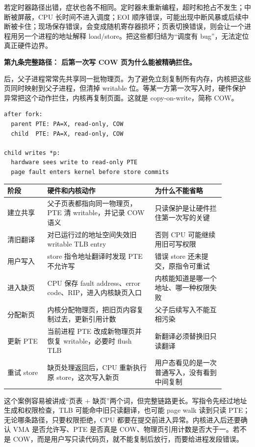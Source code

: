 若定时器路径出错，症状也各不相同。定时器未重新编程，超时和抢占不发生；中断被屏蔽，CPU 长时间不进入调度；EOI 顺序错误，可能出现中断风暴或后续中断被卡住；现场保存错误，会变成随机寄存器损坏；页表切换错误，则会让一个进程用另一个进程的地址解释 load/store。把这些都归结为“调度有 bug”，无法定位真正硬件边界。

\medskip
\noindent\textbf{第九条完整路径： 后第一次写 COW 页为什么能被精确拦住。}

 后，父子进程常常先共享同一批物理页。为了避免立刻复制所有内存，内核把这些页同时映射到父子进程，但清掉 writable 位。等某一方第一次写入时，硬件保护异常把这个动作拦住，内核再复制页面。这就是 copy-on-write，简称 COW。

\begin{lstlisting}
after fork:
  parent PTE: PA=X, read-only, COW
  child  PTE: PA=X, read-only, COW

child writes *p:
  hardware sees write to read-only PTE
  page fault enters kernel before store commits
\end{lstlisting}

\begin{longtable}{p{0.16\linewidth}p{0.43\linewidth}p{0.29\linewidth}}
\toprule
阶段 & 硬件和内核动作 & 为什么不能省略 \\
\midrule
建立共享 & 父子页表都指向同一物理页，PTE 清 writable，并记录 COW 语义 & 只读保护是让硬件拦住第一次写的关键 \\
清旧翻译 & 对已运行过的地址空间失效旧 writable TLB entry & 否则 CPU 可能继续用旧可写权限 \\
用户写入 & store 指令地址翻译时发现 PTE 不允许写 & 错误 store 还未提交，原指令可重试 \\
进入缺页 & CPU 保存 fault address、error code、RIP，进入内核缺页入口 & 内核能知道是哪一个地址、哪一种权限失败 \\
分配新页 & 内核分配物理页，把旧页内容复制过去，更新引用计数 & 父子后续写入不能互相污染 \\
更新 PTE & 当前进程 PTE 改成新物理页并恢复 writable，必要时 flush TLB & 新翻译必须替换旧只读翻译 \\
重试 store & 缺页处理返回后，CPU 重新执行原 store，这次写入新页 & 用户态看见的是一次普通写入，没有看到中间复制 \\
\bottomrule
\end{longtable}

这个案例容易被讲成“页表 + 缺页”两个词，但完整链路更长。写指令先经过地址生成和权限检查，TLB 可能命中旧只读翻译，也可能 page walk 读到只读 PTE；无论哪条路径，只要权限拒绝，CPU 都要在提交前进入异常。内核进入后还要确认 VMA 是否允许写、PTE 是否真是 COW、物理页引用计数是否大于一。若不是 COW，而是用户写只读代码页，就不能复制后放行，而要给进程发段错误。

